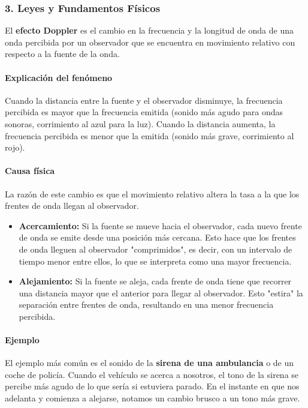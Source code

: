 \subsubsection*{3. Leyes y Fundamentos Físicos}
El \textbf{efecto Doppler} es el cambio en la frecuencia y la longitud de onda de una onda percibida por un observador que se encuentra en movimiento relativo con respecto a la fuente de la onda.

\paragraph{Explicación del fenómeno}
Cuando la distancia entre la fuente y el observador disminuye, la frecuencia percibida es mayor que la frecuencia emitida (sonido más agudo para ondas sonoras, corrimiento al azul para la luz). Cuando la distancia aumenta, la frecuencia percibida es menor que la emitida (sonido más grave, corrimiento al rojo).

\paragraph{Causa física}
La razón de este cambio es que el movimiento relativo altera la tasa a la que los frentes de onda llegan al observador.
\begin{itemize}
    \item \textbf{Acercamiento:} Si la fuente se mueve hacia el observador, cada nuevo frente de onda se emite desde una posición más cercana. Esto hace que los frentes de onda lleguen al observador "comprimidos", es decir, con un intervalo de tiempo menor entre ellos, lo que se interpreta como una mayor frecuencia.
    \item \textbf{Alejamiento:} Si la fuente se aleja, cada frente de onda tiene que recorrer una distancia mayor que el anterior para llegar al observador. Esto "estira" la separación entre frentes de onda, resultando en una menor frecuencia percibida.
\end{itemize}

\paragraph{Ejemplo}
El ejemplo más común es el sonido de la \textbf{sirena de una ambulancia} o de un coche de policía. Cuando el vehículo se acerca a nosotros, el tono de la sirena se percibe más agudo de lo que sería si estuviera parado. En el instante en que nos adelanta y comienza a alejarse, notamos un cambio brusco a un tono más grave.

